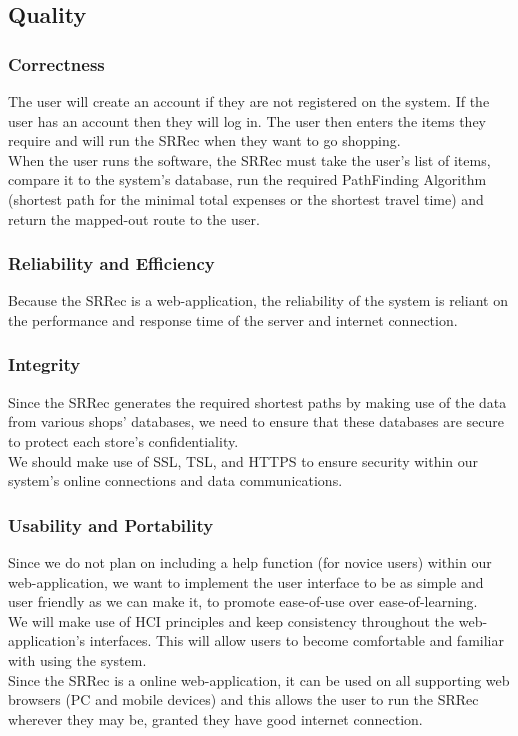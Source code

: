 \documentclass[12pt]{article}
\begin{document}
\subsection{Quality}
\subsubsection{Correctness}
The user will create an account if they are not registered on the system. If the user has an account then they will log in. The user then enters the items they require and will run the SRRec when they want to go shopping.\\
When the user runs the software, the SRRec must take the user's list of items, compare it to the system's database, run the required PathFinding Algorithm (shortest path for the minimal total expenses or the shortest travel time) and return the mapped-out route to the user.
\subsubsection{Reliability and Efficiency}
Because the SRRec is a web-application, the reliability of the system is reliant on the performance and response time of the server and internet connection. 
\subsubsection{Integrity}
Since the SRRec generates the required shortest paths by making use of the data from various shops' databases, we need to ensure that these databases are secure to protect each store's confidentiality. \\
We should make use of SSL, TSL, and HTTPS to ensure security within our system's online connections and data communications.
\subsubsection{Usability and Portability}
Since we do not plan on including a help function (for novice users) within our web-application, we want to implement the user interface to be as simple and user friendly as we can make it, to promote ease-of-use over ease-of-learning.\\
We will make use of HCI principles and keep consistency throughout the web-application's interfaces. This will allow users to become comfortable and familiar with using the system.\\
Since the SRRec is a online web-application, it can be used on all supporting web browsers (PC and mobile devices) and this allows the user to run the SRRec wherever they may be, granted they have good internet connection.\\
\end{document}
